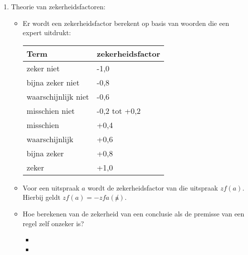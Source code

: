 \begin{itemize}
\begin{itemize}
\begin{enumerate}
\begin{itemize}
				\alert Bayesiaans redeneren is geen aangewezen methode.
			\end{itemize}
			\item Theorie van zekerheidsfactoren:
			\begin{itemize}
				\item Er wordt een zekerheidsfactor berekent op basis van woorden die een expert uitdrukt:
				\begin{table}[h]
					\centering
					\begin{tabular}{| l | l |}
						\hline 
						Term & zekerheidsfactor \\
						\hline 
						zeker niet & -1,0 \\
						bijna zeker niet & -0,8 \\
						waarschijnlijk niet & -0,6 \\
						misschien niet & -0,2 tot +0,2 \\
						misschien & +0,4 \\
						waarschijnlijk & +0,6 \\
						bijna zeker & +0,8 \\
						zeker & +1,0 \\
						\hline
					\end{tabular}
				\end{table}
			
				\item Voor een uitspraak $a$ wordt de zekerheidsfactor van die uitspraak $zf(a)$. Hierbij geldt $zf(a) = -zfa(\not a)$.
				
				\item Hoe berekenen van de zekerheid van een conclusie als de premisse van een regel zelf onzeker is?
				
				\begin{itemize}
					
					\item[] \noindent{}
		
					\item[]
					\noindent{}
					

\end{itemize}
\end{itemize}
\end{enumerate}
\end{itemize}
\end{itemize}
